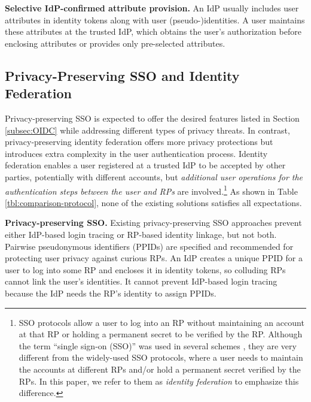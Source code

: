 \noindent\textbf{Selective IdP-confirmed attribute provision.}
An IdP usually includes user attributes in identity tokens \cite{OpenIDConnect,rfc6749} along with user (pseudo-)identities.
A user maintains these attributes at the trusted IdP,
which obtains the user's authorization before enclosing attributes or provides only pre-selected attributes.

\subsection{Privacy-Preserving SSO and Identity Federation}
\label{subsec-solutions}

\newc
Privacy-preserving SSO is expected to offer the desired features listed in Section \ref{subsec:OIDC} while addressing different types of privacy threats.
In contrast, privacy-preserving identity federation offers more privacy protections but introduces extra complexity in the user authentication process.
Identity federation enables a user registered at a trusted IdP to be accepted by other parties, potentially with different accounts,
but \emph{additional user operations for the authentication steps between the user and RPs} are involved.\footnote{\newc SSO protocols \cite{OpenIDConnect,rfc6749, SAML, SAMLIdentifier} allow a user to log into an RP without maintaining an account at that RP or holding a permanent secret to be verified by the RP. Although the term ``single sign-on (SSO)'' was used in several schemes \cite{PseudoID, Opaak, ELPASSO, WangWS13, HanCSTW18, HanCSTWW20}, they are very different from the widely-used SSO protocols, where a user needs to maintain the accounts at different RPs and/or hold a permanent secret verified by the RPs. In this paper, we refer to them as \emph{identity federation} to emphasize this difference.}
As shown in Table \ref{tbl:comparison-protocol}, none of the existing solutions satisfies all expectations.


\noindent\textbf{Privacy-preserving SSO.}
Existing privacy-preserving SSO approaches \cite{BrowserID, SPRESSO, NIST2017draft} prevent either IdP-based login tracing or RP-based identity linkage, but not both.
\oldc
Pairwise pseudonymous identifiers (PPIDs) are specified \cite{OpenIDConnect, SAMLIdentifier} and recommended \cite{NIST2017draft}
for protecting user privacy against curious RPs.
An IdP creates a unique PPID for a user to log into some RP and encloses it in identity tokens, so colluding RPs cannot link the user's identities.
It cannot prevent IdP-based login tracing because the IdP needs the RP's identity to assign PPIDs.

